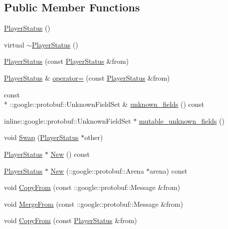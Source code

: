 \subsection*{Public Member Functions}
\begin{DoxyCompactItemize}
\item 
\hyperlink{class_player_status_a1477f7baca38dc993cb832fecb0872f5}{Player\-Status} ()
\item 
virtual \hyperlink{class_player_status_a8ad65fd082d01ec351d2e576c03b6c0c}{$\sim$\-Player\-Status} ()
\item 
\hyperlink{class_player_status_a8869154aa29284c289564424ca3d81ca}{Player\-Status} (const \hyperlink{class_player_status}{Player\-Status} \&from)
\item 
\hyperlink{class_player_status}{Player\-Status} \& \hyperlink{class_player_status_ad1150a8edc62109ee1ae7417ee476025}{operator=} (const \hyperlink{class_player_status}{Player\-Status} \&from)
\item 
const \\*
\-::google\-::protobuf\-::\-Unknown\-Field\-Set \& \hyperlink{class_player_status_ab7eee10cff7a50c69725159cf290352c}{unknown\-\_\-fields} () const 
\item 
inline\-::google\-::protobuf\-::\-Unknown\-Field\-Set $\ast$ \hyperlink{class_player_status_abed60d55b4bcce83f29d29c1fe9c768e}{mutable\-\_\-unknown\-\_\-fields} ()
\item 
void \hyperlink{class_player_status_a54451e7148d8bfc7ec996ff95296fbb6}{Swap} (\hyperlink{class_player_status}{Player\-Status} $\ast$other)
\item 
\hyperlink{class_player_status}{Player\-Status} $\ast$ \hyperlink{class_player_status_a5f463e20d20428030476245da9d6d52a}{New} () const 
\item 
\hyperlink{class_player_status}{Player\-Status} $\ast$ \hyperlink{class_player_status_a05abd2f0659614a206ca97ac55cfece0}{New} (\-::google\-::protobuf\-::\-Arena $\ast$arena) const 
\item 
void \hyperlink{class_player_status_af3573249f694a353dcfc7047af795730}{Copy\-From} (const \-::google\-::protobuf\-::\-Message \&from)
\item 
void \hyperlink{class_player_status_abf908695ca2070f30ac7289cd5b6ebc9}{Merge\-From} (const \-::google\-::protobuf\-::\-Message \&from)
\item 
void \hyperlink{class_player_status_a59b13d7a4c4d170bbf103ce9650c76af}{Copy\-From} (const \hyperlink{class_player_status}{Player\-Status} \&from)
\item 

\end{DoxyCompactItemize}
